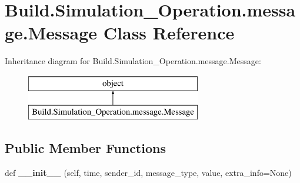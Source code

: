 \hypertarget{class_build_1_1_simulation___operation_1_1message_1_1_message}{}\section{Build.\+Simulation\+\_\+\+Operation.\+message.\+Message Class Reference}
\label{class_build_1_1_simulation___operation_1_1message_1_1_message}
Inheritance diagram for Build.\+Simulation\+\_\+\+Operation.\+message.\+Message\+:\begin{figure}[H]
\begin{center}
\leavevmode
\includegraphics[height=2.000000cm]{class_build_1_1_simulation___operation_1_1message_1_1_message}
\end{center}
\end{figure}
\subsection*{Public Member Functions}
\begin{DoxyCompactItemize}
\item 
\mbox{\label{class_build_1_1_simulation___operation_1_1message_1_1_message_ad36dcd76b28ea97a3b1c454feb5317e2}} 
def {\bfseries \+\_\+\+\_\+init\+\_\+\+\_\+} (self, time, sender\+\_\+id, message\+\_\+type, value, extra\+\_\+info=None)
\end{DoxyCompactItemize}
